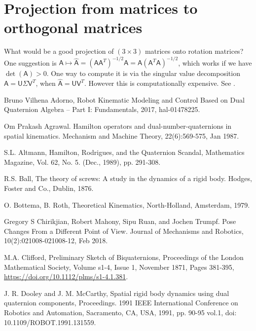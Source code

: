 \documentclass[reqno,12pt]{amsart}
\begin{document}
\section{Projection from matrices to orthogonal matrices}
\label{sec final note}

What would be a good projection of $(3 \times 3)$ matrices onto rotation matrices?  One suggestion is $\mathsf A \mapsto \widehat{\mathsf A} = (\mathsf A\mathsf A^T)^{-1/2} \mathsf A = \mathsf A (\mathsf A^T \mathsf A)^{-1/2}$, which works if we have $\det(\mathsf A) > 0$.  One way to compute it is via the singular value decomposition $\mathsf A = \mathsf U \mathsf \Sigma \mathsf V^T$, when $\widehat{\mathsf A} = \mathsf U\mathsf V^T$.  However this is computationally expensive.  See \cite{higham}.

\begin{thebibliography}{99}

 Bruno Vilhena Adorno, Robot Kinematic Modeling and Control Based on Dual Quaternion Algebra -- Part I: Fundamentals, 2017, hal-01478225.

 Om Prakash Agrawal. Hamilton operators and dual-number-quaternions in spatial kinematics. Mechanism and Machine Theory, 22(6):569-575, Jan 1987.

 S.L. Altmann, Hamilton, Rodrigues, and the Quaternion Scandal, Mathematics Magazine, Vol. 62, No. 5. (Dec., 1989), pp. 291-308.

 R.S. Ball, The theory of screws: A study in the dynamics of a rigid body. Hodges, Foster and Co., Dublin, 1876.

 O. Bottema, B. Roth, Theoretical Kinematics, North-Holland, Amsterdam, 1979.

 Gregory S Chirikjian, Robert Mahony, Sipu Ruan, and Jochen Trumpf. Pose Changes From a Different Point of View. Journal of Mechanisms and Robotics, 10(2):021008-021008-12, Feb 2018.

 M.A. Clifford, Preliminary Sketch of Biquaternions, Proceedings of the London Mathematical Society, Volume s1-4, Issue 1, November 1871, Pages 381-395, \url{https://doi.org/10.1112/plms/s1-4.1.381}.

 J. R. Dooley and J. M. McCarthy, Spatial rigid body dynamics using dual quaternion components, Proceedings. 1991 IEEE International Conference on Robotics and Automation, Sacramento, CA, USA, 1991, pp. 90-95 vol.1, doi: 10.1109/ROBOT.1991.131559.


\end{thebibliography}
\end{document}
